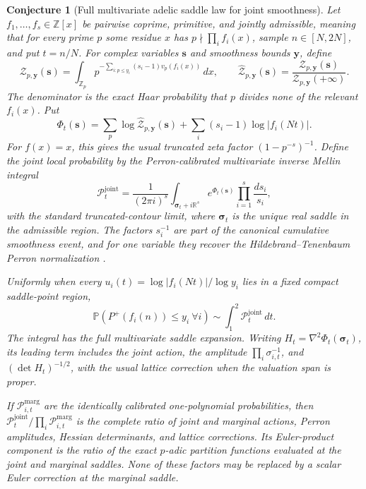 \documentclass[11pt]{article}
\newtheorem{conjecture}{Conjecture}
\theoremstyle{definition}
\newcommand{\Pp}{\mathbb P}
\newcommand{\Z}{\mathbb Z}
\newcommand{\R}{\mathbb R}
\providecommand{\Z}{\mathbb Z}
\providecommand{\R}{\mathbb R}
\providecommand{\Pp}{\mathbb P}
\begin{document}
\begin{conjecture}[Full multivariate adelic saddle law for joint smoothness]\label{s24}
Let $f_1,\ldots,f_s\in\Z[x]$ be pairwise coprime, primitive, and jointly admissible, meaning that for every prime $p$ some residue $x$ has $p\nmid\prod_{i}f_i(x)$, sample
$n\in[N,2N]$, and put $t=n/N$.  For complex variables $\mathbf s$ and smoothness bounds
$\mathbf y$, define
\[
 \mathcal Z_{p,\mathbf y}(\mathbf s)=
 \int_{\Z_p}p^{-\sum_{i:p\le y_i}(s_i-1)v_p(f_i(x))}\,dx,
 \qquad
 \widehat{\mathcal Z}_{p,\mathbf y}(\mathbf s)=
 \frac{\mathcal Z_{p,\mathbf y}(\mathbf s)}
      {\mathcal Z_{p,\mathbf y}(+\boldsymbol\infty)}.
\]
The denominator is the exact Haar probability that $p$ divides none of the relevant
$f_i(x)$.  Put
\[
 \Phi_t(\mathbf s)=
 \sum_p\log\widehat{\mathcal Z}_{p,\mathbf y}(\mathbf s)
 +\sum_i(s_i-1)\log|f_i(Nt)|.
\]
For $f(x)=x$, this gives the usual truncated zeta factor
$(1-p^{-s})^{-1}$.  Define the joint local probability by the Perron-calibrated
multivariate inverse Mellin integral
\[
 \mathscr P_t^{\mathrm{joint}}=
 \frac{1}{(2\pi i)^s}
 \int_{\boldsymbol\sigma_t+i\R^s}
 e^{\Phi_t(\mathbf s)}\prod_{i=1}^s\frac{ds_i}{s_i},
\]
with the standard truncated-contour limit, where $\boldsymbol\sigma_t$ is the unique
real saddle in the admissible region.  The factors $s_i^{-1}$ are part of the canonical
cumulative smoothness event, and for one variable they recover the
Hildebrand--Tenenbaum Perron normalization \cite{HT}.

Uniformly when every
$u_i(t)=\log|f_i(Nt)|/\log y_i$ lies in a fixed compact saddle-point region,
\[
 \Pp(P^+(f_i(n))\le y_i\ \forall i)
 \sim\int_1^2\mathscr P_t^{\mathrm{joint}}\,dt.
\]
The integral has the full multivariate saddle expansion.  Writing
$H_t=\nabla^2\Phi_t(\boldsymbol\sigma_t)$, its leading term includes the joint action,
the amplitude $\prod_i\sigma_{i,t}^{-1}$, and $(\det H_t)^{-1/2}$, with the usual
lattice correction when the valuation span is proper.

If $\mathscr P_{i,t}^{\mathrm{marg}}$ are the identically calibrated one-polynomial
probabilities, then
$\mathscr P_t^{\mathrm{joint}}/\prod_i\mathscr P_{i,t}^{\mathrm{marg}}$ is the complete
ratio of joint and marginal actions, Perron amplitudes, Hessian determinants, and lattice
corrections.  Its Euler-product component is the ratio of the exact $p$-adic partition
functions evaluated at the joint and marginal saddles.  None of these factors may be
replaced by a scalar Euler correction at the marginal saddle.
\end{conjecture}
\end{document}
